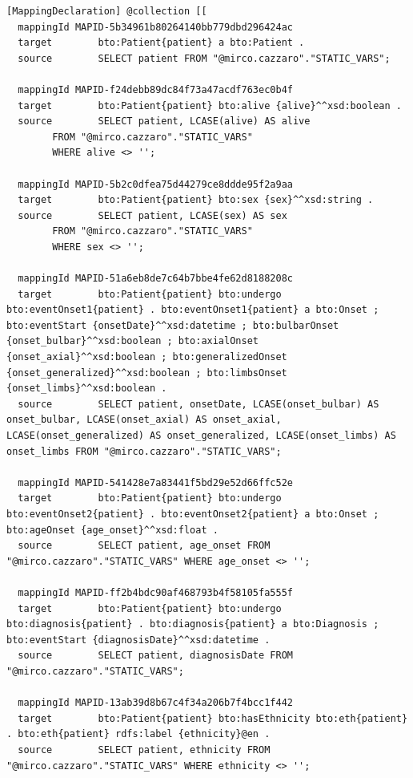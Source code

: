 \begin{lstlisting}[language=OntopNative, caption={Mappings definition between the virtual relational schema exposed by Dremio and the \ac{BRAINTEASER} Ontology}, label={lst:mappings}]
  [MappingDeclaration] @collection [[
  mappingId	MAPID-5b34961b80264140bb779dbd296424ac
  target		bto:Patient{patient} a bto:Patient . 
  source		SELECT patient FROM "@mirco.cazzaro"."STATIC_VARS";

  mappingId	MAPID-f24debb89dc84f73a47acdf763ec0b4f
  target		bto:Patient{patient} bto:alive {alive}^^xsd:boolean . 
  source		SELECT patient, LCASE(alive) AS alive
        FROM "@mirco.cazzaro"."STATIC_VARS"
        WHERE alive <> '';

  mappingId	MAPID-5b2c0dfea75d44279ce8ddde95f2a9aa
  target		bto:Patient{patient} bto:sex {sex}^^xsd:string . 
  source		SELECT patient, LCASE(sex) AS sex
        FROM "@mirco.cazzaro"."STATIC_VARS"
        WHERE sex <> '';

  mappingId	MAPID-51a6eb8de7c64b7bbe4fe62d8188208c
  target		bto:Patient{patient} bto:undergo bto:eventOnset1{patient} . bto:eventOnset1{patient} a bto:Onset ; bto:eventStart {onsetDate}^^xsd:datetime ; bto:bulbarOnset {onset_bulbar}^^xsd:boolean ; bto:axialOnset {onset_axial}^^xsd:boolean ; bto:generalizedOnset {onset_generalized}^^xsd:boolean ; bto:limbsOnset {onset_limbs}^^xsd:boolean . 
  source		SELECT patient, onsetDate, LCASE(onset_bulbar) AS onset_bulbar, LCASE(onset_axial) AS onset_axial, LCASE(onset_generalized) AS onset_generalized, LCASE(onset_limbs) AS onset_limbs FROM "@mirco.cazzaro"."STATIC_VARS";

  mappingId	MAPID-541428e7a83441f5bd29e52d66ffc52e
  target		bto:Patient{patient} bto:undergo bto:eventOnset2{patient} . bto:eventOnset2{patient} a bto:Onset ; bto:ageOnset {age_onset}^^xsd:float . 
  source		SELECT patient, age_onset FROM "@mirco.cazzaro"."STATIC_VARS" WHERE age_onset <> '';

  mappingId	MAPID-ff2b4bdc90af468793b4f58105fa555f
  target		bto:Patient{patient} bto:undergo bto:diagnosis{patient} . bto:diagnosis{patient} a bto:Diagnosis ; bto:eventStart {diagnosisDate}^^xsd:datetime . 
  source		SELECT patient, diagnosisDate FROM "@mirco.cazzaro"."STATIC_VARS";

  mappingId	MAPID-13ab39d8b67c4f34a206b7f4bcc1f442
  target		bto:Patient{patient} bto:hasEthnicity bto:eth{patient} . bto:eth{patient} rdfs:label {ethnicity}@en . 
  source		SELECT patient, ethnicity FROM "@mirco.cazzaro"."STATIC_VARS" WHERE ethnicity <> '';


\end{lstlisting}
